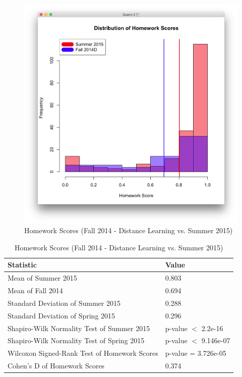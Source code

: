 \begin{figure}
	\centering
	\includegraphics[width=6in]{img/chapter4/hw_su15_vs_f14d}
	\caption[Homework Scores (Fall 2014 - Distance Learning vs. Summer 2015)]{Homework Scores (Fall 2014 - Distance Learning vs. Summer 2015)}
  \label{fig:hwSu14Su15}
\end{figure}

\begin{small}
\begin{table}
  \centering
  \begin{tabular}{|l|l|}
    \hline
    \textbf{Statistic} & \textbf{Value} \\
	\hline
	Mean of Summer 2015 & 0.803 \\
	\hline
	Mean of Fall 2014 & 0.694 \\
	\hline
	Standard Deviation of Summer 2015 & 0.288 \\
	\hline
	Standard Deviation of Spring 2015 & 0.296 \\
	\hline
	Shapiro-Wilk Normality Test of Summer 2015 & p-value $<$ 2.2e-16 \\
	\hline
	Shapiro-Wilk Normality Test of Spring 2015 & p-value $<$ 9.146e-07 \\
	\hline
	Wilcoxon Signed-Rank Test of Homework Scores & p-value = 3.726e-05 \\
	\hline
	Cohen's D of Homework Scores & 0.374 \\
	\hline
  \end{tabular}
	\caption[Homework Scores (Fall 2014 - Distance Learning vs. Summer 2015)]{Homework Scores (Fall 2014 - Distance Learning vs. Summer 2015)}
  \label{fig:hwSu14Su15}
\end{table}
\end{small}

